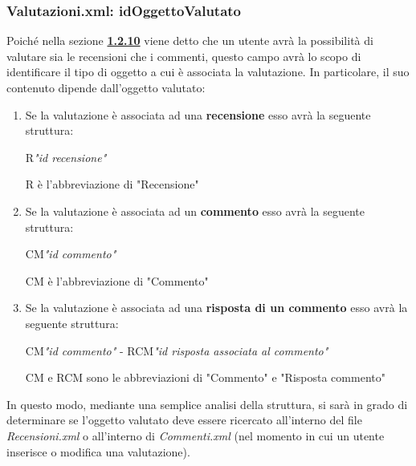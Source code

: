 \documentclass [a4paper, 12pt]{book}
\begin{document}
\subsubsection{Valutazioni.xml: idOggettoValutato}
Poiché nella sezione \hyperref[ValutazioneRecensioni]{\textbf{1.2.10}} viene detto che un utente avrà la possibilità di valutare sia le recensioni che i commenti, questo campo avrà lo scopo di identificare il tipo di oggetto a cui è associata la valutazione. In particolare, il suo contenuto dipende dall'oggetto valutato:
\begin{enumerate}
\item Se la valutazione è associata ad una \textbf{recensione} esso avrà la seguente struttura:
\begin{center}
R\textit{"id recensione"}
\end{center}
R è l'abbreviazione di "Recensione"
\item Se la valutazione è associata ad un \textbf{commento} esso avrà la seguente struttura:
\begin{center}
CM\textit{"id commento"}
\end{center}
CM è l'abbreviazione di "Commento"
\item Se la valutazione è associata ad una \textbf{risposta di un commento} esso avrà la seguente struttura:
\begin{center}
CM\textit{"id commento"} - RCM\textit{"id risposta associata al commento"}
\end{center}
CM e RCM sono le abbreviazioni di "Commento" e "Risposta commento"
\end{enumerate}
In questo modo, mediante una semplice analisi della struttura, si sarà in grado di determinare se l'oggetto valutato deve essere ricercato all'interno del file \textit{Recensioni.xml} o all'interno di \textit{Commenti.xml} (nel momento in cui un utente inserisce o modifica una valutazione).
\end{document}
